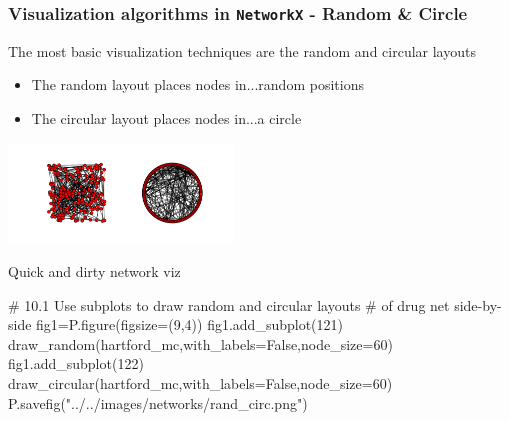 \documentclass[xcolor=dvipsnames, 9pt]{beamer}
\newenvironment{code}{\begin{semiverbatim} \begin{footnotesize}}
{\end{footnotesize}\end{semiverbatim}}
\begin{document}
\begin{frame}[fragile]
    \frametitle{Visualization algorithms in \texttt{NetworkX} - Random \& Circle}
    The most basic visualization techniques are the random and circular layouts
    \begin{itemize}
        \item The random layout places nodes in...random positions
        \item The circular layout places nodes in...a circle
    \end{itemize}
    \begin{center}
        \includegraphics[width=6cm,clip,trim=2cm 2cm 2cm 2cm]{../images/networks/rand_circ.png}
    \end{center}
    \begin{block}{Quick and dirty network viz}
        \begin{code}
# 10.1 Use subplots to draw random and circular layouts
# of drug net side-by-side
\alert<2>{fig1=P.figure(figsize=(9,4))
fig1.add_subplot(121)}
\alert<3>{draw_random(hartford_mc,with_labels=False,node_size=60)}
\alert<4>{fig1.add_subplot(122)
draw_circular(hartford_mc,with_labels=False,node_size=60)
P.savefig("../../images/networks/rand_circ.png")}
        \end{code}
    \end{block}
\end{frame}
\end{document}
